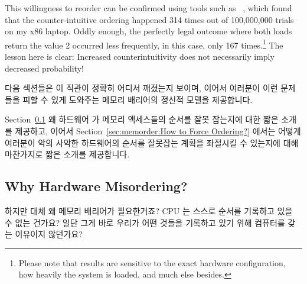 This willingness to reorder can be confirmed using tools such as
~\cite{Alglave:2014:HCM:2594291.2594347},
which found that the counter-intuitive ordering happened
314 times out of 100,000,000 trials on my x86 laptop.
Oddly enough, the perfectly legal outcome where both loads return the
value 2 occurred less frequently, in this case, only 167 times.\footnote{
	Please note that results are sensitive to the exact hardware
	configuration,
	how heavily the system is loaded, and much else besides.}
The lesson here is clear: Increased counterintuitivity does not necessarily
imply decreased probability!
\fi

다음 섹션들은 이 직관이 정확히 어디서 깨졌는지 보이며, 이어서 여러분이 이런
문제들을 피할 수 있게 도와주는 메모리 배리어의 정신적 모델을 제공합니다.

Section~\ref{sec:memorder:Why Hardware Misordering?}
왜 하드웨어 가 메모리 액세스들의 순서를 잘못 잡는지에 대한 짧은 소개를
제공하고, 이어서
Section~\ref{sec:memorder:How to Force Ordering?}
에서는 어떻게 여러분이 악의 사악한 하드웨어의 순서를 잘못잡는 계획을 좌절시킬
수 있는지에 대해 마찬가지로 짧은 소개를 제공합니다.

\subsection{Why Hardware Misordering?}
\label{sec:memorder:Why Hardware Misordering?}

하지만 대체 왜 메모리 배리어가 필요한거죠?
CPU 는 스스로 순서를 기록하고 있을 수 없는 건가요?
일단 그게 바로 우리가 어떤 것들을 기록하고 있기 위해 컴퓨터를 갖는 이유이지
않던가요?

